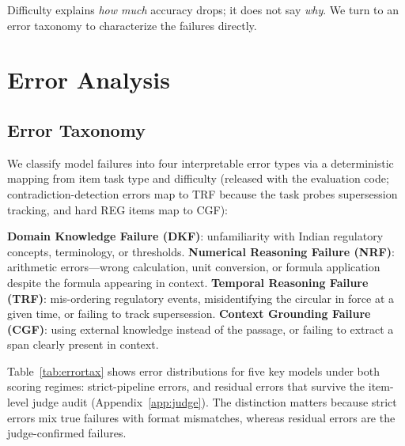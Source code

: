 \documentclass[11pt]{article}
\begin{document}
Difficulty explains \emph{how much} accuracy drops; it does not say \emph{why}. We turn to an error taxonomy to characterize the failures directly.

\section{Error Analysis}
\label{sec:errortax-sub}

\subsection{Error Taxonomy}

We classify model failures into four interpretable error types via a deterministic mapping from item task type and difficulty (released with the evaluation code; contradiction-detection errors map to TRF because the task probes supersession tracking, and hard REG items map to CGF):

\textbf{Domain Knowledge Failure (DKF)}: unfamiliarity with Indian regulatory concepts, terminology, or thresholds. \textbf{Numerical Reasoning Failure (NRF)}: arithmetic errors---wrong calculation, unit conversion, or formula application despite the formula appearing in context. \textbf{Temporal Reasoning Failure (TRF)}: mis-ordering regulatory events, misidentifying the circular in force at a given time, or failing to track supersession. \textbf{Context Grounding Failure (CGF)}: using external knowledge instead of the passage, or failing to extract a span clearly present in context.

Table~\ref{tab:errortax} shows error distributions for five key models under both scoring regimes: strict-pipeline errors, and residual errors that survive the item-level judge audit (Appendix~\ref{app:judge}). The distinction matters because strict errors mix true failures with format mismatches, whereas residual errors are the judge-confirmed failures.
\end{document}
